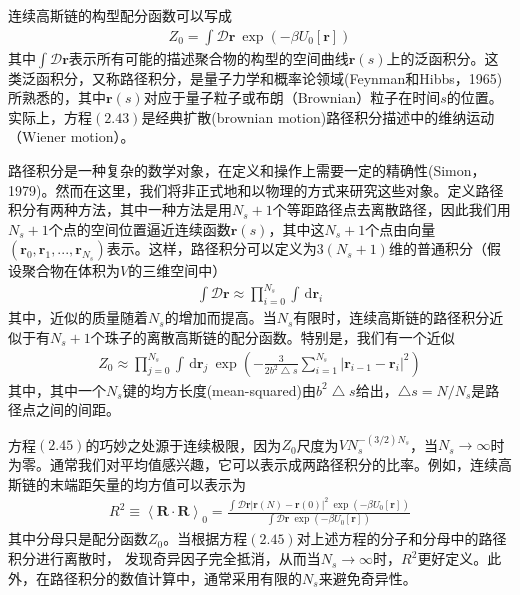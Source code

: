 连续高斯链的构型配分函数可以写成
\begin{gather}
Z_0=\int \mathcal{D}\mathbf{r}~\exp(-\beta U_0[\mathbf{r}])
\end{gather}
其中$\int \mathcal{D}\mathbf{r}$表示所有可能的描述聚合物的构型的空间曲线$\mathbf{r}(s)$上的泛函积分。这类泛函积分，又称路径积分，是量子力学和概率论领域(Feynman和Hibbs，1965)所熟悉的，其中$\mathbf{r}(s)$对应于量子粒子或布朗（Brownian）粒子在时间$s$的位置。实际上，方程$(2.43)$是经典扩散(brownian motion)路径积分描述中的维纳运动（Wiener motion）。

路径积分是一种复杂的数学对象，在定义和操作上需要一定的精确性(Simon，1979)。然而在这里，我们将非正式地和以物理的方式来研究这些对象。定义路径积分有两种方法，其中一种方法是用$N_s+1$个等距路径点去离散路径，因此我们用$N_s+1$个点的空间位置逼近连续函数$\mathbf{r}(s)$，其中这$N_s+1$个点由向量$(\mathbf{r}_0,\mathbf{r}_1,...,\mathbf{r}_{N_s})$表示。这样，路径积分可以定义为$3(N_s+1)$维的普通积分（假设聚合物在体积为$V$的三维空间中）
\begin{gather}
\int \mathcal{D}\mathbf{r}\approx \prod_{i=0}^{N_s} \int \, \mathrm{d} \mathbf{r}_i
\end{gather}
其中，近似的质量随着$N_s$的增加而提高。当$N_s$有限时，连续高斯链的路径积分近似于有$N_s+1$个珠子的离散高斯链的配分函数。特别是，我们有一个近似
\begin{gather}
Z_0\approx \prod_{j=0}^{N_s} \int \, \mathrm{d} \mathbf{r}_j~\exp \left( -\frac{3}{2b^2\bigtriangleup s}\sum_{i=1}^{N_s}\left|\mathbf{r}_{i-1}-\mathbf{r}_i \right|^2 \right)
\end{gather}
其中，其中一个$N_s$键的均方长度(mean-squared)由$b^2\bigtriangleup s$给出，$\bigtriangleup s=N/N_s$是路径点之间的间距。

方程$(2.45)$的巧妙之处源于连续极限，因为$Z_0$尺度为$VN_s^{−(3/2)N_s}$，当$N_s\rightarrow \infty$时为零。通常我们对平均值感兴趣，它可以表示成两路径积分的比率。例如，连续高斯链的末端距矢量的均方值可以表示为
\begin{gather}
R^2\equiv \left \langle \mathbf{R}\cdot \mathbf{R}\right \rangle _0=\frac{\int \mathcal{D}\mathbf{r}\left| \mathbf{r}(N)-\mathbf{r}(0) \right|^2~\exp(-\beta U_0[\mathbf{r}])}{\int \mathcal{D}\mathbf{r}~\exp(-\beta U_0[\mathbf{r}])}
\end{gather}
其中分母只是配分函数$Z_0$。当根据方程$(2.45)$对上述方程的分子和分母中的路径积分进行离散时，
发现奇异因子完全抵消，从而当$N_s\rightarrow \infty$时，$R^2$更好定义。此外，在路径积分的数值计算中，通常采用有限的$N_s$来避免奇异性。

